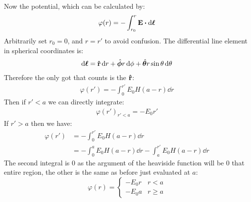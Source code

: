 \documentclass[12pt]{article}
\begin{document}
Now the potential, which can be calculated by:
\begin{align*}
  \varphi(r)=-\int_{r_0}^r\vb{E}\vdot\dd{\bm{\ell}}
\end{align*}
Arbitrarily set $r_0=0$, and $r=r'$ to avoid confusion. The differential line element in spherical coordinates is:
\begin{align*}
  \dd{\bm{\ell}}=\vu{r}\dd{r}
  +\hat{\bm{\phi}}r\dd{\phi}
  +\hat{\bm{\theta}}r\sin\theta\dd{\theta}
\end{align*}
Therefore the only got that counts is the $\vu{r}$:
\begin{align*}
  \varphi(r')=-\int_0^{r'}E_0H(a-r)\dd{r}
\end{align*}
Then if $r'<a$ we can directly integrate:
\begin{align*}
  \varphi(r')_{r'<a}=-E_0r'
\end{align*}
If $r'>a$ then we have:
\begin{align*}
  \varphi(r')&=-\int_0^{r'}E_0H(a-r)\dd{r}\\
  &=-\int_0^aE_0H(a-r)\dd{r}-\int_a^{r'}E_0H(a-r)\dd{r}
\end{align*}
The second integral is $0$ as the argument of the heaviside function will be $0$ that entire region, the other is the same as before just evaluated at $a$:
\begin{equation}
  \boxed{
    \varphi(r)=
    \begin{cases}
      -E_0r & r<a \\
      -E_0a & r\geq a
    \end{cases}
  }
\end{equation}
\end{document}
